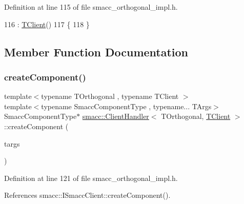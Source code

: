 Definition at line 115 of file smacc\+\_\+orthogonal\+\_\+impl.\+h.


\begin{DoxyCode}
116         : \hyperlink{classTClient}{TClient}()
117     \{
118     \}
\end{DoxyCode}


\subsection{Member Function Documentation}
\mbox{\label{classsmacc_1_1ClientHandler_a4a9adad4c37104586c9b595d9030bb3c}} 
\subsubsection{\texorpdfstring{create\+Component()}{createComponent()}}
{\footnotesize\ttfamily template$<$typename T\+Orthogonal , typename T\+Client $>$ \\
template$<$typename Smacc\+Component\+Type , typename... T\+Args$>$ \\
Smacc\+Component\+Type$\ast$ \hyperlink{classsmacc_1_1ClientHandler}{smacc\+::\+Client\+Handler}$<$ T\+Orthogonal, \hyperlink{classTClient}{T\+Client} $>$\+::create\+Component (\begin{DoxyParamCaption}\item[{T\+Args...}]{targs }\end{DoxyParamCaption})\hspace{0.3cm}{\ttfamily [inline]}}



Definition at line 121 of file smacc\+\_\+orthogonal\+\_\+impl.\+h.



References smacc\+::\+I\+Smacc\+Client\+::create\+Component().


